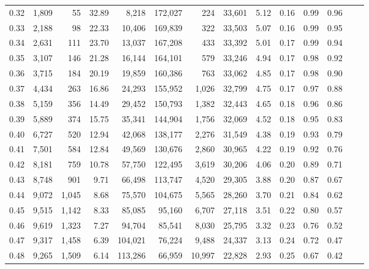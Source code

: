 \begin{tabular}{rrrrrrrrrrrrrr}
0.32 &  1,809 &     55 &   32.89 &    8,218 &  172,027 &     224 &  33,601 &  5.12 &  0.16 &  0.99 &      0.96 \\
0.33 &  2,188 &     98 &   22.33 &   10,406 &  169,839 &     322 &  33,503 &  5.07 &  0.16 &  0.99 &      0.95 \\
0.34 &  2,631 &    111 &   23.70 &   13,037 &  167,208 &     433 &  33,392 &  5.01 &  0.17 &  0.99 &      0.94 \\
0.35 &  3,107 &    146 &   21.28 &   16,144 &  164,101 &     579 &  33,246 &  4.94 &  0.17 &  0.98 &      0.92 \\
0.36 &  3,715 &    184 &   20.19 &   19,859 &  160,386 &     763 &  33,062 &  4.85 &  0.17 &  0.98 &      0.90 \\
0.37 &  4,434 &    263 &   16.86 &   24,293 &  155,952 &   1,026 &  32,799 &  4.75 &  0.17 &  0.97 &      0.88 \\
0.38 &  5,159 &    356 &   14.49 &   29,452 &  150,793 &   1,382 &  32,443 &  4.65 &  0.18 &  0.96 &      0.86 \\
0.39 &  5,889 &    374 &   15.75 &   35,341 &  144,904 &   1,756 &  32,069 &  4.52 &  0.18 &  0.95 &      0.83 \\
0.40 &  6,727 &    520 &   12.94 &   42,068 &  138,177 &   2,276 &  31,549 &  4.38 &  0.19 &  0.93 &      0.79 \\
0.41 &  7,501 &    584 &   12.84 &   49,569 &  130,676 &   2,860 &  30,965 &  4.22 &  0.19 &  0.92 &      0.76 \\
0.42 &  8,181 &    759 &   10.78 &   57,750 &  122,495 &   3,619 &  30,206 &  4.06 &  0.20 &  0.89 &      0.71 \\
0.43 &  8,748 &    901 &    9.71 &   66,498 &  113,747 &   4,520 &  29,305 &  3.88 &  0.20 &  0.87 &      0.67 \\
0.44 &  9,072 &  1,045 &    8.68 &   75,570 &  104,675 &   5,565 &  28,260 &  3.70 &  0.21 &  0.84 &      0.62 \\
0.45 &  9,515 &  1,142 &    8.33 &   85,085 &   95,160 &   6,707 &  27,118 &  3.51 &  0.22 &  0.80 &      0.57 \\
0.46 &  9,619 &  1,323 &    7.27 &   94,704 &   85,541 &   8,030 &  25,795 &  3.32 &  0.23 &  0.76 &      0.52 \\
0.47 &  9,317 &  1,458 &    6.39 &  104,021 &   76,224 &   9,488 &  24,337 &  3.13 &  0.24 &  0.72 &      0.47 \\
0.48 &  9,265 &  1,509 &    6.14 &  113,286 &   66,959 &  10,997 &  22,828 &  2.93 &  0.25 &  0.67 &      0.42 \\

\end{tabular}
